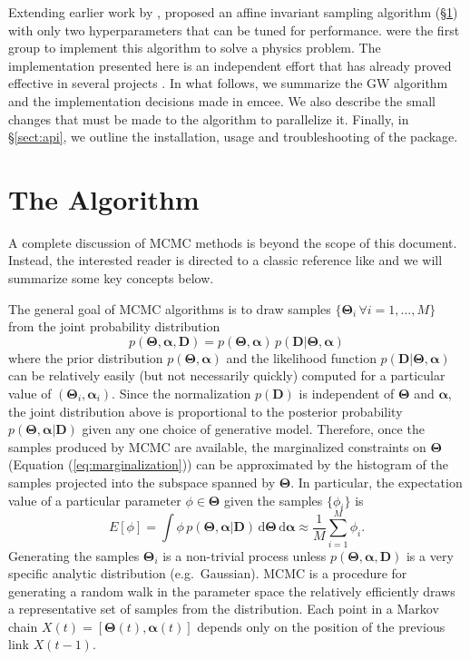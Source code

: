 \documentclass[12pt,preprint]{aastex}
\newcommand{\project}[1]{{\sffamily #1}}
\newcommand{\thisplain}{emcee}
\newcommand{\this}{\project{\thisplain}}
\newcommand{\paper}{document}
\newcommand{\eq}[1]{Equation (\ref{eq:#1})}
\newcommand{\sect}[1]{\S\ref{sect:#1}}
\newcommand{\sectlabel}[1]{\label{sect:#1}}
\newcommand{\dd}{\mathrm{d}}
\newcommand{\bvec}[1]{\boldsymbol{#1}}
\newcommand{\paramvector}[1]{\bvec{#1}}
\newcommand{\pr}{p}
\newcommand{\model}{\paramvector{\Theta}}
\newcommand{\data}{\paramvector{D}}
\newcommand{\nuisance}{\paramvector{\alpha}}
\newcommand{\link}{X}
\begin{document}
Extending earlier work by \citet{Christen:2007},
\citet[][hereafter ]{Goodman:2010} proposed an
affine invariant sampling
algorithm (\sect{algo}) with only two hyperparameters that can be tuned for
performance. \citet{Hou:2011} were the first group to implement this
algorithm to solve a physics problem. The implementation presented here is
an independent effort that has already proved effective in several projects
\citep[][Foreman-Mackey \& Widrow~2012, in prep.]{Lang:2011,
Bovy:2011, Dorman:2012}.
In what follows, we summarize the GW algorithm and the implementation
decisions made in \this. We also describe the small changes
that must be made to the algorithm to parallelize it. Finally, in \sect{api},
we outline the installation, usage and troubleshooting of the package.

\section{The Algorithm}\sectlabel{algo}

A complete discussion of MCMC methods is beyond the scope of this \paper.
Instead, the interested reader is directed to a classic reference like
\citet{MacKay:2003} and we will summarize some key concepts below.

The general goal of MCMC algorithms is to draw samples
$\{ \model_i \, \forall i=1, \ldots, M \}$ from
the joint probability distribution
\begin{equation}
    \pr (\model, \nuisance, \data) = \pr (\model, \nuisance)
            \, \pr (\data | \model, \nuisance)
\end{equation}
where the prior distribution $\pr (\model, \nuisance)$ and the likelihood
function $\pr (\data|\model,\nuisance)$ can be relatively easily (but not
necessarily quickly) computed for a particular value of
$(\model_i, \nuisance_i)$. Since the normalization $\pr (\data)$ is
independent of $\model$ and $\nuisance$, the joint distribution above is
proportional to the posterior probability $\pr (\model, \nuisance | \data)$
given any one choice of generative model. Therefore, once the samples
produced by MCMC are available, the marginalized constraints on $\model$
(\eq{marginalization}) can be approximated by the histogram of the samples
projected into the subspace spanned by $\model$. In particular, the
expectation value of a particular parameter $\phi \in \model$ given the
samples $\{ \phi_i \}$ is
\begin{equation}
    E[\phi] = \int \phi \, \pr ( \model, \nuisance | \data )
            \, \dd \model \, \dd \nuisance
            \approx \frac{1}{M} \sum_{i=1} ^M \phi_i .
\end{equation}
Generating the samples $\model_i$ is a non-trivial process unless
$\pr (\model, \nuisance, \data)$ is a very specific analytic distribution
(e.g.~Gaussian). MCMC is a procedure for generating a random walk in the
parameter space the relatively efficiently draws a representative set of
samples from the distribution. Each point in a Markov chain
$\link (t) = [\model(t), \nuisance(t)]$
depends only on the position of the previous link $\link (t-1)$.
\end{document}

